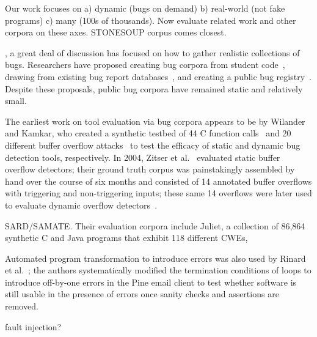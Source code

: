 Our work focuses on
a) dynamic (bugs on demand)
b) real-world (not fake programs)
c) many (100s of thousands).
Now evaluate related work and other corpora on these axes. STONESOUP
corpus comes closest.

, a great deal of discussion
has focused on how to gather realistic collections of bugs. Researchers
have proposed creating bug corpora from student code~\cite{Spacco:2005},
drawing from existing bug report databases~\cite{Lu:2005,Meftah:2005},
and creating a public bug registry~\cite{Foster:2005}. Despite these
proposals, public bug corpora have remained static and relatively small.

The earliest work on tool evaluation via bug corpora appears to be by
Wilander and Kamkar, who created a synthetic testbed of 44 C function
calls~\cite{Wilander:2002} and 20 different buffer overflow
attacks~\cite{Wilander:2003} to test the efficacy of static and dynamic
bug detection tools, respectively. In 2004, Zitser et
al.~\cite{Zitser:2004} evaluated static buffer overflow detectors; their
ground truth corpus was painstakingly assembled by hand over the course
of six months and consisted of 14 annotated buffer overflows with
triggering and non-triggering inputs; these same 14 overflows were later
used to evaluate dynamic overflow detectors~\cite{Zhivich:2005}. 

SARD/SAMATE. Their evaluation corpora include Juliet, a collection of
86,864 synthetic C and Java programs that exhibit 118 different CWEs, 

Automated program transformation to introduce errors was also used by
Rinard et al.~\cite{Rinard:2005}; the authors systematically modified
the termination conditions of loops to introduce off-by-one errors in
the Pine email client to test whether software is still usable in the
presence of errors once sanity checks and assertions are removed.

fault injection?
